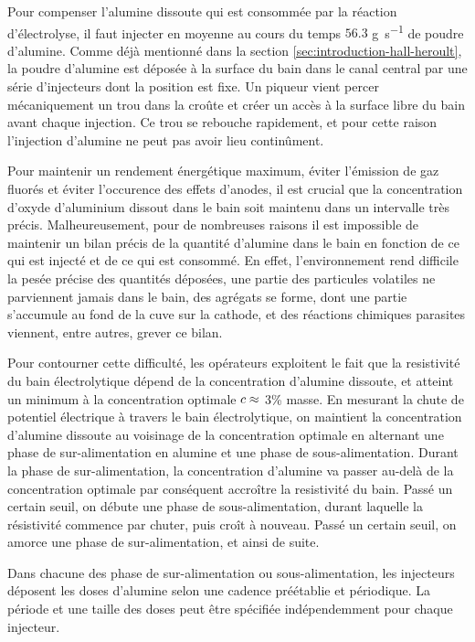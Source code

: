 Pour compenser l'alumine dissoute qui est consommée par la réaction
d'électrolyse, il faut injecter en moyenne au cours du temps $56.3$
\si{\gram\per\second} de poudre d'alumine. Comme déjà mentionné
dans la section \ref{sec:introduction-hall-heroult}, la poudre
d'alumine est déposée à la surface du bain dans le canal central par
une série d'injecteurs dont la position est fixe. Un piqueur vient
percer mécaniquement un trou dans la croûte et créer un accès à la
surface libre du bain avant chaque injection. Ce trou se rebouche
rapidement, et pour cette raison l'injection d'alumine ne peut pas
avoir lieu continûment.

Pour maintenir un rendement énergétique maximum, éviter l'émission de
gaz fluorés et éviter l'occurence des effets d'anodes, il est crucial
que la concentration d'oxyde d'aluminium dissout dans le bain soit
maintenu dans un intervalle très précis. Malheureusement, pour de
nombreuses raisons il est impossible de maintenir un bilan précis de
la quantité d'alumine dans le bain en fonction de ce qui est injecté
et de ce qui est consommé. En effet, l'environnement rend difficile la
pesée précise des quantités déposées, une partie des particules
volatiles ne parviennent jamais dans le bain, des agrégats se forme,
dont une partie s'accumule au fond de la cuve sur la cathode, et des
réactions chimiques parasites viennent, entre autres, grever ce bilan.

Pour contourner cette difficulté, les opérateurs exploitent le fait
que la resistivité du bain électrolytique dépend de la concentration
d'alumine dissoute, et atteint un minimum à la concentration optimale
$c \approx$ \num{3}\% masse. En mesurant la chute de
potentiel électrique à travers le bain électrolytique, on maintient la
concentration d'alumine dissoute au voisinage de la concentration
optimale en alternant une phase de sur-alimentation en alumine et une
phase de sous-alimentation. Durant la phase de sur-alimentation, la
concentration d'alumine va passer au-delà de la concentration optimale
par conséquent accroître la resistivité du bain. Passé un certain
seuil, on débute une phase de sous-alimentation, durant laquelle la
résistivité commence par chuter, puis croît à nouveau. Passé un
certain seuil, on amorce une phase de sur-alimentation, et ainsi de
suite.

Dans chacune des phase de sur-alimentation ou sous-alimentation, les
injecteurs déposent les doses d'alumine selon une cadence préétablie
et périodique. La période et une taille des doses peut être spécifiée
indépendemment pour chaque injecteur.

